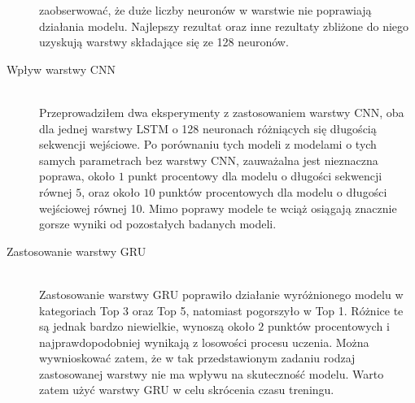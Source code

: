 \begin{description}
    zaobserwować, że duże liczby neuronów w warstwie nie poprawiają działania modelu. Najlepszy rezultat oraz inne rezultaty zbliżone 
    do niego uzyskują warstwy składające się ze 128 neuronów. \\
    \item[Wpływ warstwy CNN]
    \hfill \\ Przeprowadziłem dwa eksperymenty z zastosowaniem warstwy CNN, oba dla jednej warstwy LSTM o 128 neuronach różniących się długością 
    sekwencji wejściowe. Po porównaniu tych modeli z modelami o tych samych parametrach bez warstwy CNN, zauważalna jest nieznaczna poprawa, około 
    \begin{math}1\end{math} punkt procentowy dla modelu o długości sekwencji równej \begin{math}5\end{math}, oraz około \begin{math}10\end{math} 
    punktów procentowych dla modelu o długości wejściowej równej 10. Mimo poprawy modele te wciąż osiągają znacznie gorsze wyniki od 
    pozostałych badanych modeli. \\
    \item[Zastosowanie warstwy GRU]
    \hfill \\ Zastosowanie warstwy GRU poprawiło działanie wyróżnionego modelu w kategoriach Top 3 oraz Top 5, natomiast pogorszyło w Top 1. Różnice te są jednak bardzo 
    niewielkie, wynoszą około \begin{math}2 \end{math} punktów procentowych i najprawdopodobniej wynikają z losowości procesu uczenia. Można 
    wywnioskować zatem, że w tak przedstawionym zadaniu rodzaj zastosowanej warstwy nie ma wpływu na skuteczność modelu. Warto zatem użyć warstwy 
    GRU w celu skrócenia czasu treningu. \\
  \end{description}

